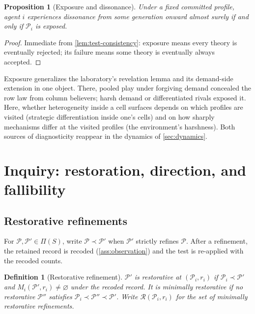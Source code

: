 \documentclass[11pt]{article}
\newtheorem{definition}[assumption]{Definition}
\newtheorem{proposition}[assumption]{Proposition}
\newcommand{\emptysetset}{\varnothing}
\begin{document}
\begin{proposition}[Exposure and dissonance]
\label{prop:exposure}
Under a fixed committed profile, agent $i$ experiences dissonance from some
generation onward almost surely if and only if $\mathcal P_i$ is exposed.
\end{proposition}

\begin{proof}
Immediate from \cref{lem:test-consistency}: exposure means every theory is
eventually rejected; its failure means some theory is eventually always
accepted.
\end{proof}

Exposure generalizes the laboratory's revelation lemma and its demand-side
extension in one object.  There, pooled play under forgiving demand concealed
the row law from column believers; harsh demand or differentiated rivals
exposed it.  Here, whether heterogeneity inside a cell surfaces depends on
which profiles are visited (strategic differentiation inside one's cells) and
on how sharply mechanisms differ at the visited profiles (the environment's
harshness).  Both sources of diagnosticity reappear in the dynamics of
\cref{sec:dynamics}.

\section{Inquiry: restoration, direction, and fallibility}
\label{sec:inquiry}

\subsection{Restorative refinements}

For $\mathcal P,\mathcal P'\in\Pi(S)$, write $\mathcal P\prec\mathcal P'$ when
$\mathcal P'$ strictly refines $\mathcal P$.  After a refinement, the retained
record is recoded (\cref{ass:observation}) and the test is re-applied with the
recoded counts.

\begin{definition}[Restorative refinement]
\label{def:restorative}
$\mathcal P'$ is \emph{restorative} at $(\mathcal P_i,r_i)$ if
$\mathcal P_i\prec\mathcal P'$ and
$\widehat M_i(\mathcal P',r_i)\neq\emptysetset$ under the recoded record.  It
is \emph{minimally restorative} if no restorative $\mathcal P''$ satisfies
$\mathcal P_i\prec\mathcal P''\prec\mathcal P'$.  Write
$\mathcal R(\mathcal P_i,r_i)$ for the set of minimally restorative
refinements.
\end{definition}
\end{document}
